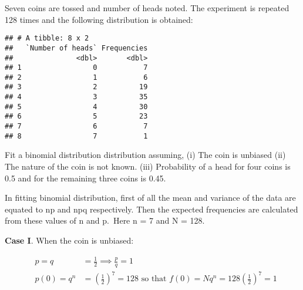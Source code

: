 \documentclass[ignorenonframetext,aspectratio=169]{beamer}
\begin{document}
\begin{frame}[fragile]{}
\protect\hypertarget{section-28}{}

Seven coins are tossed and number of heads noted. The experiment is
repeated 128 times and the following distribution is obtained:

\begin{verbatim}
## # A tibble: 8 x 2
##   `Number of heads` Frequencies
##               <dbl>       <dbl>
## 1                 0           7
## 2                 1           6
## 3                 2          19
## 4                 3          35
## 5                 4          30
## 6                 5          23
## 7                 6           7
## 8                 7           1
\end{verbatim}

Fit a binomial distribution distribution assuming, (i) The coin is
unbiased (ii) The nature of the coin is not known. (iii) Probability of
a head for four coins is 0.5 and for the remaining three coins is 0.45.

\end{frame}

\begin{frame}{}
\protect\hypertarget{section-29}{}

In fitting binomial distribution, first of all the mean and variance of
the data are equated to np and npq respectively. Then the expected
frequencies are calculated from these values of n and p.~Here n = 7 and
N = 128.

\textbf{Case I}. When the coin is unbiased:

\[
\begin{aligned}
&p = q &= \frac{1}{2} \implies \frac{p}{q} = 1 \\
&p(0) = q^n &= \left(\frac{1}{2}\right)^7 = 128 \text{ so that } f(0) = Nq^n = 128\left(\frac{1}{2}\right)^7 = 1
\end{aligned}
\]

\end{frame}
\end{document}
